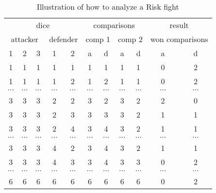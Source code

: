 \documentclass{article}
\begin{document}
\begin{table}[h]
\begin{tabular}{ccccc|cccc|cc}
\hline
\multicolumn{5}{c}{dice} & \multicolumn{4}{c}{comparisons} & \multicolumn{2}{c}{result} \\
\multicolumn{3}{c}{attacker} & \multicolumn{2}{c}{defender} & \multicolumn{2}{c}{comp 1} & \multicolumn{2}{c}{comp 2} & \multicolumn{2}{c}{won comparisons} \\
1 & 2 & 3 & 1 & 2 & a & d & a & d & a & d \\
\hline
1 & 1 & 1 & 1 & 1 & 1 & 1 & 1 & 1 & 0 & 2 \\
1 & 1 & 1 & 1 & 2 & 1 & 2 & 1 & 1 & 0 & 2 \\
$\cdots$ & $\cdots$ & $\cdots$ & $\cdots$ & $\cdots$ & $\cdots$ & $\cdots$ & $\cdots$ & $\cdots$ & $\cdots$ & $\cdots$ \\
3 & 3 & 3 & 2 & 2 & 3 & 2 & 3 & 2 & 2 & 0 \\
3 & 3 & 3 & 2 & 3 & 3 & 3 & 3 & 2 & 1 & 1 \\
3 & 3 & 3 & 2 & 4 & 3 & 4 & 3 & 2 & 1 & 1 \\
$\cdots$ & $\cdots$ & $\cdots$ & $\cdots$ & $\cdots$ & $\cdots$ & $\cdots$ & $\cdots$ & $\cdots$ & $\cdots$ & $\cdots$ \\
3 & 3 & 3 & 4 & 2 & 3 & 4 & 3 & 2 & 1 & 1 \\
3 & 3 & 3 & 4 & 3 & 3 & 4 & 3 & 3 & 0 & 2 \\
$\cdots$ & $\cdots$ & $\cdots$ & $\cdots$ & $\cdots$ & $\cdots$ & $\cdots$ & $\cdots$ & $\cdots$ & $\cdots$ & $\cdots$ \\
6 & 6 & 6 & 6 & 6 & 6 & 6 & 6 & 6 & 0 & 2 \\
\hline
\end{tabular}
\caption{Illustration of how to analyze a Risk fight}
\label{tab:risk}
\end{table}
\end{document}
